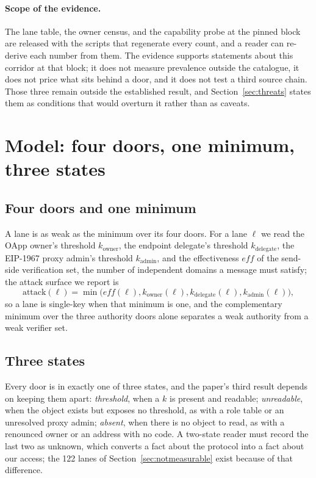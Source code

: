 \documentclass[10pt,a4paper]{article}
\newcommand{\lane}{\ell}
\newcommand{\eff}{\mathit{eff}}
\newcommand{\kown}{k_{\mathrm{owner}}}
\newcommand{\kdel}{k_{\mathrm{delegate}}}
\newcommand{\kadm}{k_{\mathrm{admin}}}
\begin{document}
\paragraph{Scope of the evidence.}
The lane table, the owner census, and the capability probe at the pinned block are released with the
scripts that regenerate every count, and a reader can re-derive each number from them. The evidence supports
statements about this corridor at that block; it does not measure prevalence outside the catalogue, it does
not price what sits behind a door, and it does not test a third source chain. Those three remain outside the
established result, and Section~\ref{sec:threats} states them as conditions that would overturn it rather
than as caveats.

\section{Model: four doors, one minimum, three states}
\label{sec:model}

\subsection{Four doors and one minimum}
A lane is as weak as the minimum over its four doors. For a lane $\lane$ we read the OApp owner's
threshold $\kown$, the endpoint delegate's threshold $\kdel$, the EIP-1967 proxy admin's threshold
$\kadm$, and the effectiveness $\eff$ of the send-side verification set, the number of independent
domains a message must satisfy; the attack surface we report is
\begin{equation}
\mathrm{attack}(\lane)=\min\bigl(\eff(\lane),\kown(\lane),\kdel(\lane),\kadm(\lane)\bigr),
\end{equation}
so a lane is single-key when that minimum is one, and the complementary minimum over the three
authority doors alone separates a weak authority from a weak verifier set.

\subsection{Three states}
Every door is in exactly one of three states, and the paper's third result depends on keeping them
apart: \emph{threshold}, when a $k$ is present and readable; \emph{unreadable}, when the object exists
but exposes no threshold, as with a role table or an unresolved proxy admin; \emph{absent}, when there
is no object to read, as with a renounced owner or an address with no code. A two-state reader must
record the last two as unknown, which converts a fact about the protocol into a fact about our access;
the 122 lanes of Section~\ref{sec:notmeasurable} exist because of that difference.
\end{document}
